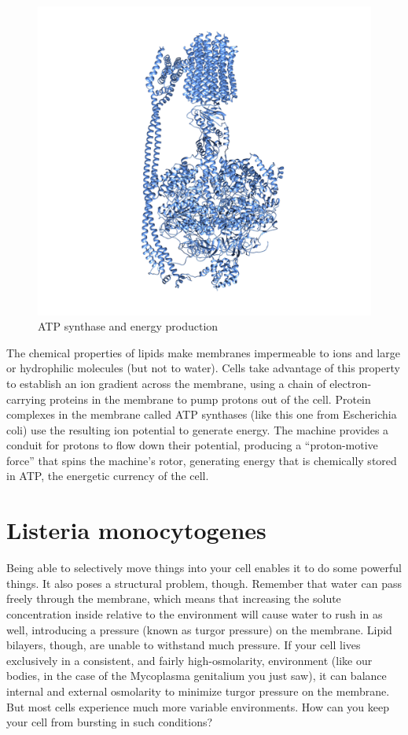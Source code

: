 \documentclass[]{tufte-book}
\begin{document}
\begin{figure}
\includegraphics{img/02_schematic/2_1_2_ATPsynthase} \caption[ATP synthase and energy production]{ATP synthase and energy production}\label{fig:2-1-2}
\end{figure}

The chemical properties of lipids make membranes impermeable to ions and large or hydrophilic molecules (but not to water). Cells take advantage of this property to establish an ion gradient across the membrane, using a chain of electron-carrying proteins in the membrane to pump protons out of the cell. Protein complexes in the membrane called ATP synthases (like this one from Escherichia coli) use the resulting ion potential to generate energy. The machine provides a conduit for protons to flow down their potential, producing a ``proton-motive force'' that spins the machine's rotor, generating energy that is chemically stored in ATP, the energetic currency of the cell.

\hypertarget{listeria-monocytogenes}{%
\section{Listeria monocytogenes}\label{listeria-monocytogenes}}

Being able to selectively move things into your cell enables it to do some powerful things. It also poses a structural problem, though. Remember that water can pass freely through the membrane, which means that increasing the solute concentration inside relative to the environment will cause water to rush in as well, introducing a pressure (known as turgor pressure) on the membrane. Lipid bilayers, though, are unable to withstand much pressure. If your cell lives exclusively in a consistent, and fairly high-osmolarity, environment (like our bodies, in the case of the Mycoplasma genitalium you just saw), it can balance internal and external osmolarity to minimize turgor pressure on the membrane. But most cells experience much more variable environments. How can you keep your cell from bursting in such conditions?
\end{document}
